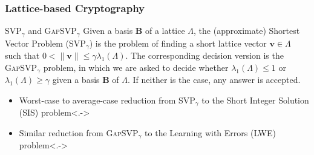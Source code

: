 \documentclass[t, aspectratio=169]{beamer}
\begin{document}
\begin{frame}
    \frametitle{Lattice-based Cryptography}
    \begin{block}{SVP$_\gamma$ and \textsc{GapSVP}$_\gamma$}
        Given a basis $\mathbf{B}$ of a lattice $\Lambda$, the (approximate) Shortest Vector Problem (SVP$_\gamma$) is the problem of finding a short lattice vector $\mathbf{v}\in \Lambda$ such that $0 < \|\mathbf{v} \| \leq \gamma \lambda_1(\Lambda)$. The corresponding decision version is the \textsc{GapSVP}$_\gamma$ problem, in which we are asked to decide whether $\lambda_1(\Lambda) \leq 1$ or $\lambda_1(\Lambda) \geq \gamma$ given a basis $\mathbf{B}$ of $\Lambda$. If neither is the case, any answer is accepted.
    \end{block}\pause
    \begin{itemize}[<+->]
        \item Worst-case to average-case reduction from SVP$_\gamma$ to the Short Integer Solution (SIS) problem\only<.->{}
        \item Similar reduction from \textsc{GapSVP}$_\gamma$ to the Learning with Errors (LWE) problem\only<.->{} %
    \end{itemize}
\end{frame}
\end{document}
